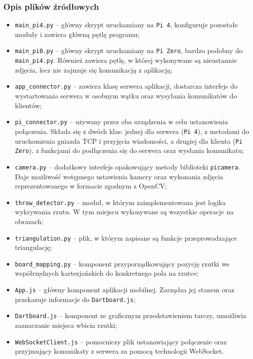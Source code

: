 \subsubsection{Opis plików źródłowych}
\begin{itemize}
  \item \verb|main_pi4.py| -- główny skrypt uruchamiany na \verb|Pi 4|, konfiguruje pozostałe moduły i zawiera główną pętlę programu;
  \item \verb|main_pi0.py| -- główny skrypt uruchamiany na \verb|Pi Zero|, bardzo podobny do \verb|main_pi4.py|. Również zawiera pętlę, w której wykonywane są nieustannie zdjęcia, lecz nie zajmuje się komunikacją z aplikacją;
  \item \verb|app_connector.py| -- zawiera klasę serwera aplikacji, dostarcza interfejs do wystartowania serwera w osobnym wątku oraz wysyłania komunikatów do klientów;
  \item \verb|pi_connector.py| -- używany przez oba urządzenia w celu ustanowienia połączenia. Składa się z dwóch klas: jednej dla serwera (\verb|Pi 4|), z metodami do uruchomienia gniazda TCP i przyjęcia wiadomości, a drugiej dla klienta (\verb|Pi Zero|), z funkcjami do podłączenia się do serwera oraz wysłania komunikatu;
  \item \verb|camera.py| -- dodatkowy interfejs opakowujący metody biblioteki \verb|picamera|. Daje możliwość wstępnego ustawienia kamery oraz wykonania zdjęcia reprezentowanego w formacie zgodnym z OpenCV;
  \item \verb|throw_detector.py| -- moduł, w którym zaimplementowana jest logika wykrywania rzutu. W tym miejscu wykonywane są wszystkie operacje na obrazach;
  \item \verb|triangulation.py| -- plik, w którym zapisane są funkcje przeprowadzające triangulację;
  \item \verb|board_mapping.py| -- komponent przyporządkowujący pozycję rzutki we współrzędnych kartezjańskich do konkretnego pola na rzutce;
  \item \verb|App.js| -- główny komponent aplikacji mobilnej. Zarządza jej stanem oraz przekazuje informacje do \verb|Dartboard.js|;
  \item \verb|Dartboard.js| -- komponent ze graficznym przedstawieniem tarczy, umożliwia zaznaczanie miejsca wbicia rzutki;
  \item \verb|WebSocketClient.js| -- pomocniczy plik ustanawiający połączenie oraz przyjmujący komunikaty z serwera za pomocą technologii WebSocket.
  
\end{itemize}

